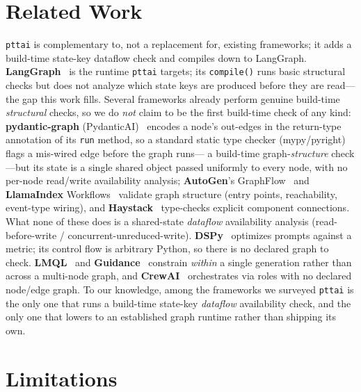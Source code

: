 \documentclass[11pt]{article}
\newcommand{\code}[1]{\texttt{#1}}
\begin{document}
\section{Related Work}
\label{sec:related}

\code{pttai} is complementary to, not a replacement for, existing frameworks; it
adds a build-time state-key dataflow check and compiles down to LangGraph.
\textbf{LangGraph}~\citep{langgraph} is the runtime \code{pttai} targets; its
\code{compile()} runs basic structural checks but does not analyze which state
keys are produced before they are read---the gap this work fills. Several
frameworks already perform genuine build-time \emph{structural} checks, so we do
\emph{not} claim to be the first build-time check of any kind:
\textbf{pydantic-graph} (PydanticAI)~\citep{pydanticgraph} encodes a node's
out-edges in the return-type annotation of its \code{run} method, so a standard
static type checker (mypy/pyright) flags a mis-wired edge before the graph runs---
a build-time graph-\emph{structure} check---but its state is a single shared
object passed uniformly to every node, with no per-node read/write availability
analysis; \textbf{AutoGen}'s GraphFlow~\citep{autogen} and
\textbf{LlamaIndex} Workflows~\citep{llamaindex} validate graph structure (entry
points, reachability, event-type wiring), and \textbf{Haystack}~\citep{haystack}
type-checks explicit component connections. What none of these does is a
shared-state \emph{dataflow} availability analysis (read-before-write /
concurrent-unreduced-write). \textbf{DSPy}~\citep{dspy} optimizes prompts against
a metric; its control flow is arbitrary Python, so there is no declared graph to
check. \textbf{LMQL}~\citep{lmql} and \textbf{Guidance}~\citep{guidance} constrain
\emph{within} a single generation rather than across a multi-node graph, and
\textbf{CrewAI}~\citep{crewai} orchestrates via roles with no declared node/edge
graph. To our knowledge, among the frameworks we surveyed \code{pttai} is the
only one that runs a build-time state-key \emph{dataflow} availability check, and
the only one that lowers to an established graph runtime rather than shipping its
own.

\section*{Limitations}
\end{document}
